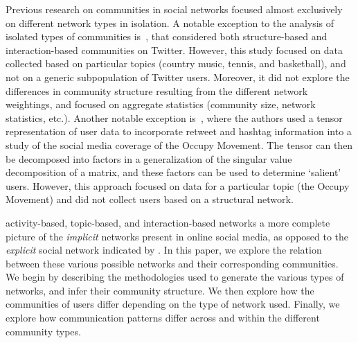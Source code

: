 Previous research on communities in social networks focused almost exclusively on different network types in isolation.
A notable exception to the analysis of isolated types of communities is~\cite{lim2012tweets}, that considered both structure-based and interaction-based communities on Twitter. However, this study focused on data collected based on particular topics (country music, tennis, and basketball), and not on a generic subpopulation of Twitter users. Moreover, it did not explore the differences in community structure resulting from the different network weightings, and focused on aggregate statistics (community size, network statistics, etc.). Another notable exception is~\cite{kao2013talison}, where the authors used a tensor representation of user data to incorporate retweet and hashtag information into a study of the social media coverage of the Occupy Movement. The tensor can then be decomposed into factors in a generalization of the singular value decomposition of a matrix, and these factors can be used to determine `salient' users. However, this approach focused on data for a particular topic (the Occupy Movement) and did not collect users based on a structural network.

\DIFdelbegin {}\DIFdelend \DIFaddbegin {}\DIFaddend activity-based, topic-based, and interaction-based networks \DIFdelbegin {}\DIFdelend \DIFaddbegin {}\DIFaddend a more complete picture of the \emph{implicit} networks present in online social media, as opposed to the \emph{explicit} social network indicated by \DIFdelbegin {}\DIFdelend \DIFaddbegin {}\DIFaddend . In this paper, we explore the relation between these various possible networks and their corresponding communities. We begin by describing the methodologies used to generate the various types of networks, and infer their community structure.  We then explore how the communities of users differ depending on the type of network used. Finally, we explore how communication patterns differ across and within the different community types. \DIFdelbegin %

\DIFdelend \DIFaddbegin {}\DIFaddend %

